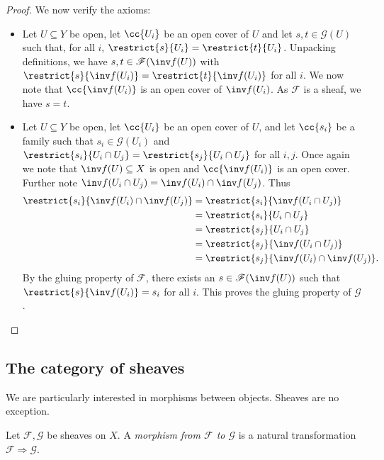 \documentclass{article}
\begin{document}
\begin{example}
\begin{proof}
    We now verify the axioms:
    \begin{itemize}
      \item Let $U\subseteq Y$ be open, let $\cc{U_i}$ be an open cover
        of $U$ and let $s,t\in\mathscr G(U)$ such that, for all
        $i$, $\restrict{s}{U_i}=\restrict{t}{U_i}$. Unpacking definitions,
        we have $s,t\in\mathscr F(\inv f(U))$ with
        $\restrict{s}{\inv f(U_i)} = \restrict{t}{\inv f(U_i)}$
        for all $i$. We now note that $\cc{\inv f(U_i)}$ is an open
        cover of $\inv f(U_i)$. As $\mathscr F$ is a sheaf,
        we have $s=t$.
      \item Let $U\subseteq Y$ be open, let $\cc{U_i}$ be an open
        cover of $U$, and let $\cc{s_i}$ be a family such that
        $s_i\in\mathscr G(U_i)$ and $\restrict{s_i}{U_i\cap U_j}
        =\restrict{s_j}{U_i\cap U_j}$ for all $i,j$.
        Once again we note that $\inv f(U)\subseteq X$ is open and
        $\cc{\inv f(U_i)}$ is an open cover. Further note
        $\inv f(U_i\cap U_j)=\inv f(U_i)\cap\inv f(U_j)$.
        Thus
        \begin{align*}
          \restrict{s_i}{\inv f(U_i)\cap \inv f(U_j)}
          &= \restrict{s_i}{\inv f(U_i\cap U_j)} \\
          &= \restrict{s_i}{U_i\cap U_j} \\
          &= \restrict{s_j}{U_i\cap U_j} \\
          &= \restrict{s_j}{\inv f(U_i\cap U_j)} \\
          &= \restrict{s_j}{\inv f(U_i)\cap \inv f(U_j)}.
        \end{align*}
        By the gluing property of $\mathscr F$, there
        exists an $s\in\mathscr F(\inv f(U))$ such that
        $\restrict{s}{\inv f(U_i)} = s_i$ for all $i$. This
        proves the gluing property of $\mathscr G$.
    \end{itemize}
  \end{proof}
\end{example}

\subsection{The category of sheaves}

We are particularly interested in morphisms between objects. Sheaves
are no exception.
\begin{definition}
  Let $\mathscr F,\mathscr G$ be sheaves on $X$. A \emph{morphism from
  $\mathscr F$ to $\mathscr G$} is a natural transformation
  $\mathscr F\Rightarrow\mathscr G$.
\end{definition}
\end{document}
